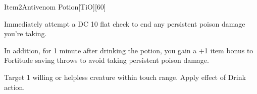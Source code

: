 

\begin{card}{Item}{2}{Antivenom Potion}[TiO][60]

  
  

Immediately attempt a DC 10 flat check to end any persistent poison damage 
you're taking.

In addition, for 1 minute after drinking the potion, 
you gain a +1 item bonus to Fortitude saving throws to 
avoid taking persistent poison damage.


Target 1 willing or helpless creature within touch range.
Apply effect of Drink action.

\vfill
{}
\end{card}
